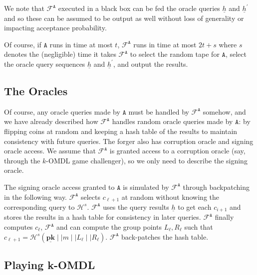 \documentclass{mrl}
\theoremstyle{plain}
\theoremstyle{definition}
\begin{document}
We note that $\mathcal{F}^{\texttt{A}}$ executed in a black box can be fed the oracle queries $\underline{h}$ and $\underline{h}^\prime$ and so these can be assumed to be output as well without loss of generality or impacting acceptance probability.


Of course, if $\texttt{A}$ runs in time at most $t$, $\mathcal{F}^{\texttt{A}}$ runs in time at most $2t+s$ where $s$ denotes the (negligible) time it takes $\mathcal{F}^{\texttt{A}}$ to select the random tape for $\texttt{A}$, select the oracle query sequences $\underline{h}$ and $\underline{h}^\prime$, and output the results. 

\subsection{The Oracles}

Of course, any oracle queries made by $\texttt{A}$ must be handled by $\mathcal{F}^{\texttt{A}}$ somehow, and we have already described how $\mathcal{F}^{\texttt{A}}$ handles random oracle queries made by $\texttt{A}$: by flipping coins at random and keeping a hash table of the results to maintain consistency with future queries. The forger also has corruption oracle and signing oracle access. We assume that $\mathcal{F}^{\texttt{A}}$ is granted access to a corruption oracle (say, through the $k$-OMDL game challenger), so we only need to describe the signing oracle. 


The signing oracle access granted to $\texttt{A}$ is simulated by $\mathcal{F}^{\texttt{A}}$ through backpatching in the following way. $\mathcal{F}^{\texttt{A}}$ selects $c_{\ell+1}$ at random without knowing the corresponding query to $\mathcal{H}^s$. $\mathcal{F}^{\texttt{A}}$ uses the query results $\underline{h}$ to get each $c_{i+1}$ and stores the results in a hash table for consistency in later queries. $\mathcal{F}^{\texttt{A}}$ finally computes $c_\ell$, $\mathcal{F}^{\texttt{A}}$ and can compute the group points $L_\ell, R_\ell$ such that $c_{\ell+1} = \mathcal{H}^s(\underline{\textbf{pk}} \mid \mid m \mid \mid L_\ell \mid \mid R_\ell)$. $\mathcal{F}^{\texttt{A}}$ back-patches the hash table.


\subsection{Playing k-OMDL}
\end{document}
